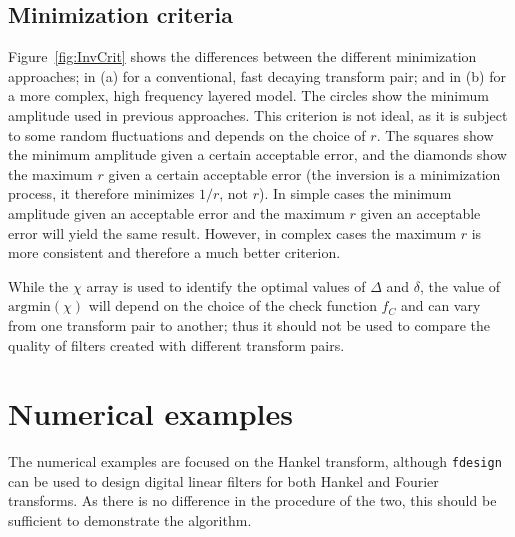 \documentclass[paper,twocolumn,twoside]{geophysics}
\newcommand{\mr}[1]{\mathrm{#1}}
\begin{document}
\subsection{Minimization criteria}
Figure~\ref{fig:InvCrit} shows the differences between the different
minimization approaches; in (a) for a conventional, fast decaying transform
pair; and in (b) for a more complex, high frequency layered model. The circles
show the minimum amplitude used in previous approaches. This criterion is not
ideal, as it is subject to some random fluctuations and depends on the choice
of $r$. The squares show the minimum amplitude given a certain acceptable
error, and the diamonds show the maximum $r$ given a certain acceptable error
(the inversion is a minimization process, it therefore minimizes $1/r$, not
$r$). In simple cases the minimum amplitude given an acceptable error and the
maximum $r$ given an acceptable error will yield the same result. However, in
complex cases the maximum $r$ is more consistent and therefore a much better
criterion.
%
%

While the $\chi$ array is used to identify the optimal values of $\Delta$ and
$\delta$, the value of $\mr{argmin}(\chi)$ will depend on the choice of the
check function $f_C$ and can vary from one transform pair to another; thus it
should not be used to compare the quality of filters created with different
transform pairs.


\section{Numerical examples}

The numerical examples are focused on the Hankel transform, although
\texttt{fdesign} can be used to design digital linear filters for both Hankel
and Fourier transforms. As there is no difference in the procedure of the two,
this should be sufficient to demonstrate the algorithm.
\end{document}
